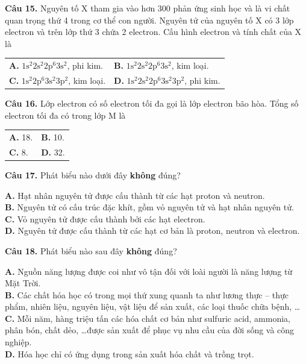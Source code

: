 \documentclass{article}
\begin{document}
\fontsize{30}{39}\selectfont
\textbf{Câu 15.} Nguyên tố X tham gia vào hơn 300 phản ứng sinh học và là vi chất quan trọng thứ 4 trong cơ thể con người. Nguyên tử của nguyên tố X có 3 lớp electron và trên lớp thứ 3 chứa 2 electron. Cấu hình electron và tính chất của X là
\vspace{6pt}

\begin{tabularx}{\linewidth}{@{}X X@{}}
\textbf{A.} $1\text{s}^2 2\text{s}^2 2\text{p}^6 3\text{s}^2$, phi kim. & \textbf{B.} $1\text{s}^2 2\text{s}^2 2\text{p}^6 3\text{s}^2$, kim loại.\\[8pt]
\textbf{C.} $1\text{s}^2 2\text{p}^6 3\text{s}^2 3\text{p}^2$, kim loại. & \textbf{D.} $1\text{s}^2 2\text{s}^2 2\text{p}^6 3\text{s}^2 3\text{p}^2$, phi kim.
\end{tabularx}

\vspace*{\fill}

\textbf{Câu 16.} Lớp electron có số electron tối đa gọi là lớp electron bão hòa. Tổng số electron tối đa có trong lớp M là
\vspace{8pt}

\begin{tabularx}{\linewidth}{@{}X X@{}}
\textbf{A.} 18. & \textbf{B.} 10.\\[8pt]
\textbf{C.} 8. & \textbf{D.} 32.
\end{tabularx}
\vspace*{\fill}
\newpage

\fontsize{23}{29}\selectfont
\textbf{Câu 17.} Phát biểu nào dưới đây \textbf{không} đúng?
\vspace{2pt}

\textbf{A.} Hạt nhân nguyên tử được cấu thành từ các hạt proton và neutron.\\
\textbf{B.} Nguyên tử có cấu trúc đặc khít, gồm vỏ nguyên tử và hạt nhân nguyên tử.\\
\textbf{C.} Vỏ nguyên tử được cấu thành bởi các hạt electron.\\
\textbf{D.} Nguyên tử được cấu thành từ các hạt cơ bản là proton, neutron và electron.

\vspace*{\fill}

\textbf{Câu 18.} Phát biểu nào sau đây \textbf{không} đúng?
\vspace{2pt}

\textbf{A.} Nguồn năng lượng được coi như vô tận đối với loài người là năng lượng từ Mặt Trời.\\
\textbf{B.} Các chất hóa học có trong mọi thứ xung quanh ta như lương thực -- thực phẩm, nhiên liệu, nguyên liệu, vật liệu để sản xuất, các loại thuốc chữa bệnh, \dots\\
\textbf{C.} Mỗi năm, hàng triệu tấn các hóa chất cơ bản như sulfuric acid, ammonia, phân bón, chất dẻo, \dots được sản xuất để phục vụ nhu cầu của đời sống và công nghiệp.\\
\textbf{D.} Hóa học chỉ có ứng dụng trong sản xuất hóa chất và trồng trọt.
\vspace*{\fill}
\newpage
\end{document}
